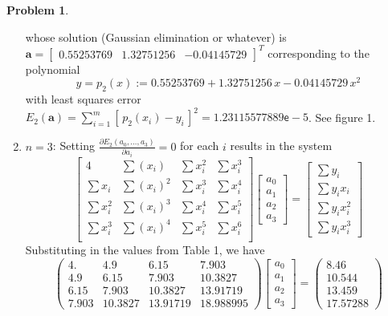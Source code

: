 \documentclass[10pt]{article}
\theoremstyle{plain}
\theoremstyle{definition}
\newtheorem{prob}{Problem}
\numberwithin{equation}{section}
\begin{document}
\begin{prob}
\begin{enumerate}[\bfseries(a)]
    whose solution (Gaussian elimination or whatever) is
    $\bm{a} = \begin{bmatrix} 0.55253769  & 1.32751256 & -0.04145729\end{bmatrix}^T$
    corresponding to the polynomial
    \[
            \boxed{y = p_2(x) := 0.55253769 + 1.32751256 \,x - 0.04145729\, x^2}
        \]
        with least squares error
        $E_2(\bm{a}) = \sum_{i=1}^m \left[\, p_2(x_i) - y_i\, \right]^2 = 1.23115577889\mathsf{e}-5$.
        See figure 1. 
\item $n=3$:
    Setting $\frac{\partial E_2(a_0, \ldots , a_3)}{\partial a_i} = 0$ for each $i$
    results in the system
\[
\begin{bmatrix}
    4          & \sum (x_i)   & \sum x_i^2 & \sum x_i^3 \\
    \sum x_i   & \sum (x_i)^2 & \sum x_i^3 & \sum x_i^4 \\
    \sum x_i^2 & \sum (x_i)^3 & \sum x_i^4 & \sum x_i^5 \\
    \sum x_i^3 & \sum (x_i)^4 & \sum x_i^5 & \sum x_i^6 \\
\end{bmatrix}
\begin{bmatrix} a_0 \\ a_1 \\ a_2 \\ a_3 \end{bmatrix}
=
\begin{bmatrix} \sum y_i \\ \sum y_i x_i \\ \sum y_i x_i^2 \\ \sum y_i x_i^3 \end{bmatrix}
\]
Substituting in the values from Table 1, we have
\[
\begin{pmatrix}
4.      &   4.9     &   6.15    &   7.903   \\
4.9     &   6.15    &   7.903   &  10.3827  \\
6.15    &   7.903   &  10.3827  &  13.91719 \\
7.903   &  10.3827  &  13.91719 &  18.988995
\end{pmatrix}
\begin{bmatrix} a_0 \\ a_1 \\ a_2 \\ a_3 \end{bmatrix}
= \begin{pmatrix} 8.46    \\ 10.544   \\ 13.459   \\ 17.57288 \end{pmatrix}
\]
\end{enumerate}
\end{prob}
\end{document}
